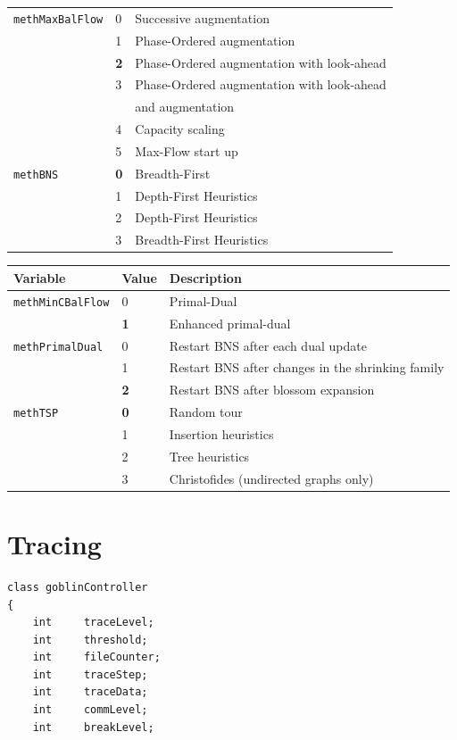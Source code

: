 \documentclass[a4paper,11pt,twoside]{book}
\begin{document}
\begin{multicols}{2}
\begin{center}
\begin{tabular}{|p{3cm}|p{1cm}|p{8cm}|}
\verb/methMaxBalFlow/& 0 & Successive augmentation \\
                    & 1 & Phase-Ordered augmentation \\
                    & {\bf 2} & Phase-Ordered augmentation with look-ahead \\
                    & 3 & Phase-Ordered augmentation with look-ahead \\
                    &   & and augmentation \\
                    & 4 & Capacity scaling \\
                    & 5 & Max-Flow start up \\
\hline
\verb/methBNS/      & {\bf 0} & Breadth-First \\
                    & 1 & Depth-First Heuristics \\
                    & 2 & Depth-First Heuristics \\
                    & 3 & Breadth-First Heuristics\\
\hline
\end{tabular}

\newpage
\begin{tabular}{|p{3cm}|p{1cm}|p{8cm}|}
\hline
{\bf Variable} & {\bf Value} & {\bf Description} \\
\hline
\hline
\verb/methMinCBalFlow/& 0 & Primal-Dual \\
                    & {\bf 1} & Enhanced primal-dual \\
\hline
\verb/methPrimalDual/& 0 & Restart BNS after each dual update \\
                    & 1 & Restart BNS after changes in the shrinking family \\
                    & {\bf 2} & Restart BNS after blossom expansion \\
\hline
\verb/methTSP/   & {\bf 0} & Random tour \\
                    & 1 & Insertion heuristics \\
                    & 2 & Tree heuristics \\
                    & 3 & Christofides (undirected graphs only) \\
\hline
\end{tabular}
\end{center}
\bigskip



\section{Tracing}
\label{slb_tracing}
\begin{mymethods}
\begin{verbatim}
class goblinController
{
    int     traceLevel;
    int     threshold;
    int     fileCounter;
    int     traceStep;
    int     traceData;
    int     commLevel;
    int     breakLevel;


\end{verbatim}
\end{mymethods}
\end{multicols}
\end{document}
